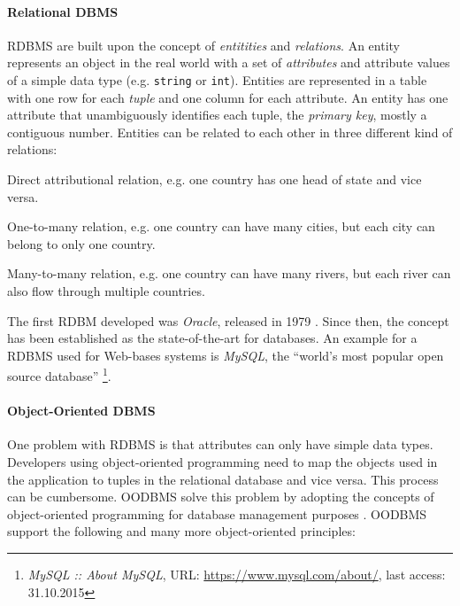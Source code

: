 \paragraph{Relational DBMS} %
\label{par:relational_dbms}

RDBMS are built upon the concept of \emph{entitities} and \emph{relations}. An entity represents an object in the real world with a set of \emph{attributes} and attribute values of a simple data type (e.g. \texttt{string} or \texttt{int}). Entities are represented in a table with one row for each \emph{tuple} and one column for each attribute. An entity has one attribute that unambiguously identifies each tuple, the \emph{primary key}, mostly a contiguous number. Entities can be related to each other in three different kind of relations:
\begin{compactenum}
  \item[\texttt{1:1}] Direct attributional relation, e.g. one country has one head of state and vice versa.
  \item[\texttt{1:n}] One-to-many relation, e.g. one country can have many cities, but each city can belong to only one country.
  \item[\texttt{m:n}] Many-to-many relation, e.g. one country can have many rivers, but each river can also flow through multiple countries.
\end{compactenum}

The first RDBM developed was \emph{Oracle}, released in 1979 \cite{oracleDB}. Since then, the concept has been established as the state-of-the-art for databases. An example for a RDBMS used for Web-bases systems is \emph{MySQL}, the ``world's most popular open source database''
\footnote{
  \emph{MySQL :: About MySQL},
  URL: \url{https://www.mysql.com/about/},
  last access: 31.10.2015
}.


\paragraph{Object-Oriented DBMS} %
\label{par:object_oriented_dbms}

One problem with RDBMS is that attributes can only have simple data types. Developers using object-oriented programming need to map the objects used in the application to tuples in the relational database and vice versa. This process can be cumbersome. OODBMS solve this problem by adopting the concepts of object-oriented programming for database management purposes
\cite{oodbms}.
OODBMS support the following and many more object-oriented principles:

